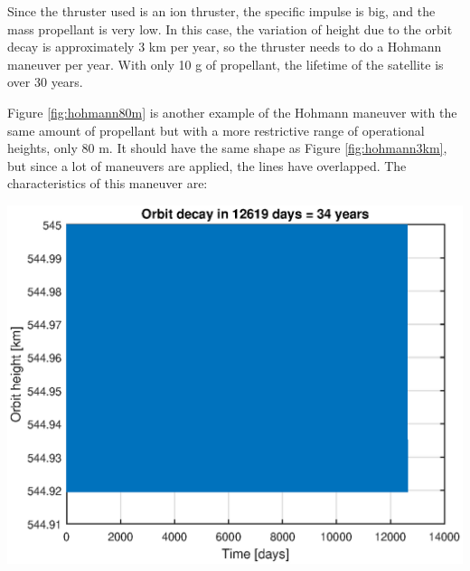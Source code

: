 \noindent
Since the thruster used is an ion thruster, the specific impulse is big, and the mass propellant is very low. In this case, the variation of height due to the orbit decay is approximately 3 km per year, so the thruster needs to do a Hohmann maneuver per year. With only 10 g of propellant, the lifetime of the satellite is over 30 years.

Figure \ref{fig:hohmann80m} is another example of the Hohmann maneuver with the same amount of propellant but with a more restrictive range of operational heights, only 80 m. It should have the same shape as Figure \ref{fig:hohmann3km}, but since a lot of maneuvers are applied, the lines have overlapped. The characteristics of this maneuver are:

\begin{minipage}{\textwidth}
\begin{minipage}[b]{0.49\textwidth}
\centering
\includegraphics[scale=0.4]{ThrustersDrag/thrust80m.eps}
\label{fig:hohmann80m}
\end{minipage}
\hfill
{}
\end{minipage}

